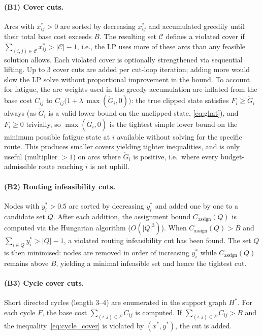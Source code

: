 \documentclass[11pt,a4paper]{article}
\begin{document}
\paragraph{(B1) Cover cuts.}
Arcs with $x_{ij}^* > 0$ are sorted by decreasing $x_{ij}^*$ and accumulated greedily until their total base cost exceeds $B$.
The resulting set $\mathcal{C}$ defines a violated cover if $\sum_{(i,j) \in \mathcal{C}} x_{ij}^* > |\mathcal{C}| - 1$, i.e., the LP uses more of these arcs than any feasible solution allows.
Each violated cover is optionally strengthened via sequential lifting.
Up to 3 cover cuts are added per cut-loop iteration; adding more would slow the LP solve without proportional improvement in the bound.
To account for fatigue, the arc weights used in the greedy accumulation are inflated from the base cost $C_{ij}$ to $C_{ij}\bigl(1 + \lambda\, \max(\check{G}_i, 0)\bigr)$: the true clipped state satisfies $F_i \geq \check{G}_i$ always (as $\check{G}_i$ is a valid lower bound on the unclipped state, \cref{eq:ghat}), and $F_i \geq 0$ trivially, so $\max(\check{G}_i,0)$ is the tightest simple lower bound on the minimum possible fatigue state at $i$ available without solving for the specific route.
This produces smaller covers yielding tighter inequalities, and is only useful (multiplier $>1$) on arcs where $\check{G}_i$ is positive, i.e.\ where every budget-admissible route reaching $i$ is net uphill.

\paragraph{(B2) Routing infeasibility cuts.}
Nodes with $y_i^* > 0.5$ are sorted by decreasing $y_i^*$ and added one by one to a candidate set $Q$.
After each addition, the assignment bound $C_{\text{assign}}(Q)$ is computed via the Hungarian algorithm ($O(|Q|^3)$).
When $C_{\text{assign}}(Q) > B$ and $\sum_{i \in Q} y_i^* > |Q| - 1$, a violated routing infeasibility cut has been found.
The set $Q$ is then minimised: nodes are removed in order of increasing $y_i^*$ while $C_{\text{assign}}(Q)$ remains above $B$, yielding a minimal infeasible set and hence the tightest cut.

\paragraph{(B3) Cycle cover cuts.}
Short directed cycles (length 3--4) are enumerated in the support graph $H^*$.
For each cycle $F$, the base cost $\sum_{(i,j) \in F} C_{ij}$ is computed.
If $\sum_{(i,j) \in F} C_{ij} > B$ and the inequality~\eqref{eq:cycle_cover} is violated by $(x^*, y^*)$, the cut is added.
\end{document}
